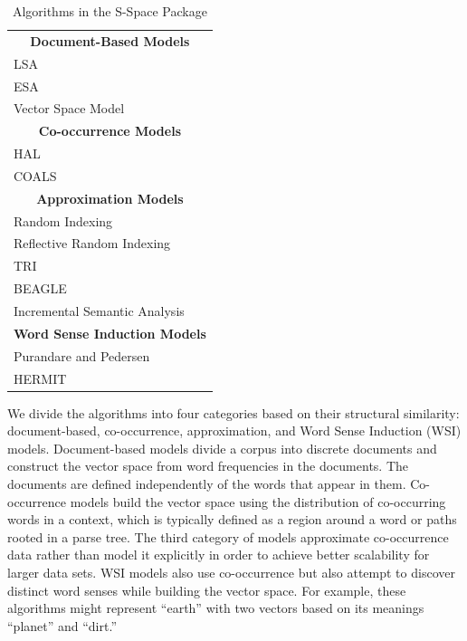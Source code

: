 \begin{table}[tb]
  \small
  \begin{tabular}{l}
    \toprule
    \multicolumn{1}{c}{\bf Document-Based Models} \\
    LSA \cite{landauer97solution} \\
    ESA \cite{gabrilovich07computing} \\
    Vector Space Model \cite{salton75vector} \\

    \midrule
    \multicolumn{1}{c}{\bf Co-occurrence Models} \\
    HAL \cite{burgess97modeling} \\
    COALS \cite{rohde09improved} \\

    \midrule
    \multicolumn{1}{c}{\bf Approximation Models} \\
    Random Indexing \cite{sahlgren08permutations} \\
    Reflective Random Indexing \cite{cohen2009reflective} \\
    TRI \cite{jurgens09event} \\
    BEAGLE \cite{jones06high} \\
    Incremental Semantic Analysis \cite{baroni07isa} \\

    \midrule
    \multicolumn{1}{c}{\bf Word Sense Induction Models} \\
    Purandare and Pedersen \cite{purandare04word} \\
    HERMIT \cite{jurgens10improving} \\
    \bottomrule
  \end{tabular}
  \caption{Algorithms in the S-Space Package}
  \label{tab:algorithms}
\end{table}


We divide the algorithms into four categories based on their structural
similarity: document-based, co-occurrence, approximation, and Word Sense
Induction (WSI) models.  Document-based models divide a corpus into discrete
documents and construct the vector space from word frequencies in the documents.
The documents are defined independently of the words that appear in them.
Co-occurrence models build the vector space using the distribution of
co-occurring words in a context, which is typically defined as a region around a
word or paths rooted in a parse tree.  The third category of models approximate
co-occurrence data rather than model it explicitly in order to achieve better
scalability for larger data sets.  WSI models also use co-occurrence but also
attempt to discover distinct word senses while building the vector space.  For
example, these algorithms might represent ``earth'' with two vectors based on
its meanings ``planet'' and ``dirt.''

